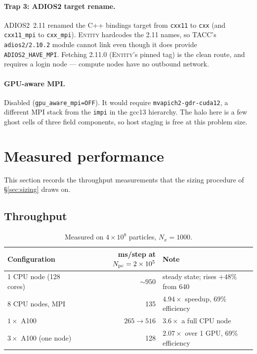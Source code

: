 \documentclass[11pt,a4paper]{article}
\newcommand{\code}[1]{\texttt{\small #1}}
\newcommand{\Npc}{N_{\rm pc}}
\begin{document}
\paragraph{Trap 3: ADIOS2 target rename.} ADIOS2~2.11 renamed the C++ bindings target
from \code{cxx11} to \code{cxx} (and \code{cxx11\_mpi} to \code{cxx\_mpi}).
\textsc{Entity} hardcodes the 2.11 names, so TACC's \code{adios2/2.10.2} module cannot
link even though it does provide \code{ADIOS2\_HAVE\_MPI}. Fetching 2.11.0
(\textsc{Entity}'s pinned tag) is the clean route, and requires a login node --- compute
nodes have no outbound network.

\paragraph{GPU-aware MPI.} Disabled (\code{gpu\_aware\_mpi=OFF}). It would require
\code{mvapich2-gdr-cuda12}, a different MPI stack from the \code{impi} in the gcc13
hierarchy. The halo here is a few ghost cells of three field components, so host
staging is free at this problem size.

\section{Measured performance}
\label{sec:perf}
\label{sec:running}

This section records the throughput measurements that the sizing procedure of
\S\ref{sec:sizing} draws on.

\subsection{Throughput}

\begin{table}[h]
\centering\small
\begin{tabular}{@{}lrl@{}}
\toprule
Configuration & ms/step at $\Npc = 2\times10^5$ & Note \\
\midrule
1 CPU node (128 cores)     & ${\sim}950$ & steady state; rises $+48\%$ from 640 \\
8 CPU nodes, MPI           & 135         & $4.94\times$ speedup, 69\% efficiency \\
$1\times$ A100             & $265 \rightarrow 516$ & $3.6\times$ a full CPU node \\
$3\times$ A100 (one node)  & 128         & $2.07\times$ over 1 GPU, 69\% efficiency \\
\bottomrule
\end{tabular}
\caption{Measured on $4\times10^8$ particles, $N_x = 1000$.}
\label{tab:perf}
\end{table}
\end{document}
